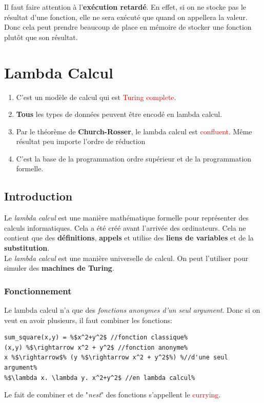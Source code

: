 \documentclass{report}
\begin{document}
Il faut faire attention à l'\textbf{exécution retardé}. En effet, si on ne stocke pas le résultat d'une fonction, elle ne sera exécuté que quand on appellera la valeur. Donc cela peut prendre beaucoup de place en mémoire de stocker une fonction plutôt que son résultat.


\chapter{Lambda Calcul}
\begin{enumerate}
\item C'est un modèle de calcul qui est \textcolor{red}{Turing complete}. 
\item \textbf{Tous} les types de données peuvent être encodé en lambda calcul.
\item Par le théorème de \textbf{Church-Rosser}, le lambda calcul est \textcolor{red}{confluent}. Même résultat peu importe l'ordre de réduction
\item C'est la base de la programmation ordre supérieur et de la programmation formelle.
\end{enumerate}
\section{Introduction}
Le \textit{lambda calcul} est une manière mathématique formelle pour représenter des calculs informatiques. Cela a été créé avant l'arrivée des ordinateurs. Cela ne contient que des \textbf{définitions}, \textbf{appels} et utilise des \textbf{liens de variables} et de la \textbf{substitution}.\\

Le \textit{lambda calcul} est une manière universelle de calcul. On peut l'utiliser pour simuler des \textbf{machines de Turing}.

\subsection{Fonctionnement}
Le lambda calcul n'a que des \textit{fonctions anonymes d'un seul argument}. Donc si on veut en avoir plusieurs, il faut combiner les fonctions:
\begin{lstlisting}[escapechar=\%]
sum_square(x,y) = %$x^2+y^2$ //fonction classique%
(x,y) %$\rightarrow x^2 + y^2$ //fonction anonyme%
x %$\rightarrow$% (y %$\rightarrow x^2 + y^2$%) %//d'une seul argument%
%$\lambda x. \lambda y. x^2+y^2$ //en lambda calcul%    
\end{lstlisting}
Le fait de combiner et de "\textit{nest}" des fonctions s'appellent le \textcolor{red}{currying}.
\end{document}

